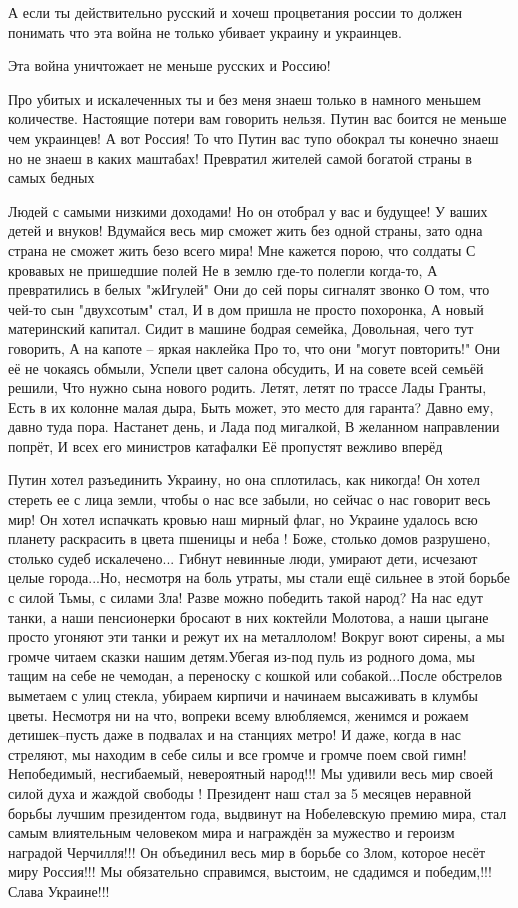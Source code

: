 А если ты действительно русский и хочеш процветания россии то должен понимать
что эта война не только убивает украину и украинцев.

Эта война уничтожает не меньше русских и Россию!

Про убитых и искалеченных ты и без меня знаеш только в намного меньшем
количестве. Настоящие потери вам говорить нельзя. Путин вас боится не меньше
чем украинцев! А вот Россия! То что Путин вас тупо обокрал ты конечно знаеш но
не знаеш в каких маштабах! Превратил жителей самой богатой страны в самых
бедных

Людей с самыми низкими доходами! Но он отобрал у вас и будущее! У ваших детей и
внуков! Вдумайся весь мир сможет жить без одной страны, зато одна страна не
сможет жить безо всего мира!
Мне кажется порою, что солдаты
С кровавых не пришедшие полей
Не в землю где-то полегли когда-то,
А превратились в белых "жИгулей"
Они до сей поры сигналят звонко
О том, что чей-то сын "двухсотым" стал,
И в дом пришла не просто похоронка,
А новый материнский капитал.
Сидит в машине бодрая семейка,
Довольная, чего тут говорить,
А на капоте – яркая наклейка
Про то, что они "могут повторить!"
Они её не чокаясь обмыли,
Успели цвет салона обсудить,
И на совете всей семьёй решили,
Что нужно сына нового родить.
Летят, летят по трассе Лады Гранты,
Есть в их колонне малая дыра,
Быть может, это место для гаранта?
Давно ему, давно туда пора.
Настанет день, и Лада под мигалкой,
В желанном направлении попрёт,
И всех его министров катафалки
Её пропустят вежливо вперёд


Путин хотел разъединить Украину, но она сплотилась, как никогда! Он хотел
стереть ее с лица земли, чтобы о нас все забыли, но сейчас о нас говорит весь
мир! Он хотел испачкать кровью наш мирный флаг, но Украине удалось всю планету
раскрасить в цвета пшеницы и неба ! Боже, столько домов разрушено, столько
судеб искалечено... Гибнут невинные люди, умирают дети, исчезают целые
города...Но, несмотря на боль утраты, мы стали ещё сильнее в этой борьбе с
силой Тьмы, с силами Зла! Разве можно победить такой народ? На нас едут танки,
а наши пенсионерки бросают в них коктейли Молотова, а наши цыгане просто
угоняют эти танки и режут их на металлолом! Вокруг воют сирены, а мы громче
читаем сказки нашим детям.Убегая из-под пуль из родного дома, мы тащим на себе
не чемодан, а переноску с кошкой или собакой...После обстрелов выметаем с улиц
стекла, убираем кирпичи и начинаем высаживать в клумбы цветы. Несмотря ни на
что, вопреки всему влюбляемся, женимся и рожаем детишек--пусть даже в подвалах
и на станциях метро! И даже, когда в нас стреляют, мы находим в себе силы и все
громче и громче поем свой гимн! Непобедимый, несгибаемый, невероятный народ!!!
Мы удивили весь мир своей силой духа и жаждой свободы ! Президент наш стал за 5
месяцев неравной борьбы лучшим президентом года, выдвинут на Нобелевскую премию
мира, стал самым влиятельным человеком мира и награждён за мужество и героизм
наградой Черчилля!!! Он объединил весь мир в борьбе со Злом, которое несёт миру
Россия!!! Мы обязательно справимся, выстоим, не сдадимся и победим,!!!Слава
Украине!!!

